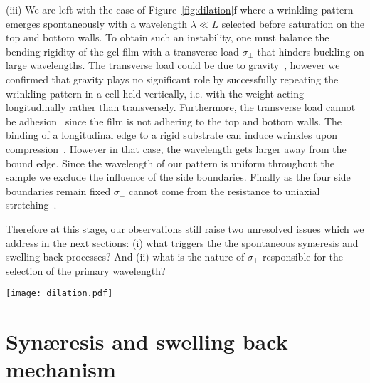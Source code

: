 \documentclass[twocolumn,superscriptaddress,showpacs,preprintnumbers,
amsmath,amssymb,prl]{revtex4-1}
\begin{document}
\noindent
(iii) We are left with the case of Figure~\ref{fig:dilation}f where a wrinkling pattern emerges spontaneously with a wavelength $\lambda\ll L$ selected before saturation on the top and bottom walls. To obtain such an instability, one must balance the bending rigidity of the gel film with a transverse load $\sigma_{\perp}$ that hinders buckling on large wavelengths. The transverse load could be due to gravity~\cite{Smoluchowski1910, Kolinski2009, Vella2009, Pineirua2013, Lucantonio2013}, however we confirmed that gravity plays no significant role by successfully repeating the wrinkling pattern in a cell held vertically, i.e. with the weight acting longitudinally rather than transversely. Furthermore, the transverse load cannot be adhesion~\cite{Vella2009a} since the film is not adhering to the top and bottom walls. 
%
The binding of a longitudinal edge to a rigid substrate can induce wrinkles upon compression~\cite{Vandeparre2011a, Li2013}. However in that case, the wavelength gets larger away from the bound edge. Since the wavelength of our pattern is uniform throughout the sample we exclude the influence of the side boundaries.
%
%
Finally as the four side boundaries remain fixed $\sigma_{\perp}$ cannot come from the resistance to uniaxial stretching~\cite{Cerda2003}.

Therefore at this stage, our observations still raise two unresolved issues which we address in the next sections: (i) what triggers the the spontaneous syn\ae{}resis and swelling back processes? And (ii) what is the nature of $\sigma_{\perp}$ responsible for the selection of the primary wavelength?

\begin{figure*}
\texttt{[image: dilation.pdf]}
\caption{The wrinkling experiment. (a) Initial configuration where the sealed cell contains a homogeneous protein solution. (b) Around the isoelectric pH, the gel forms and immediately expels solvent leading to (c). If tensile stresses were not released we would observe reversible swelling back leading to (d) a flat swollen gel layer. If tensile stresses are released, swelling back leads either to buckling (e) or to wrinkling (f) depending on whether the bending is free or hindered by a transverse load.}
\label{fig:dilation}
\end{figure*}

\section*{Syn\ae{}resis and swelling back mechanism}
\end{document}
